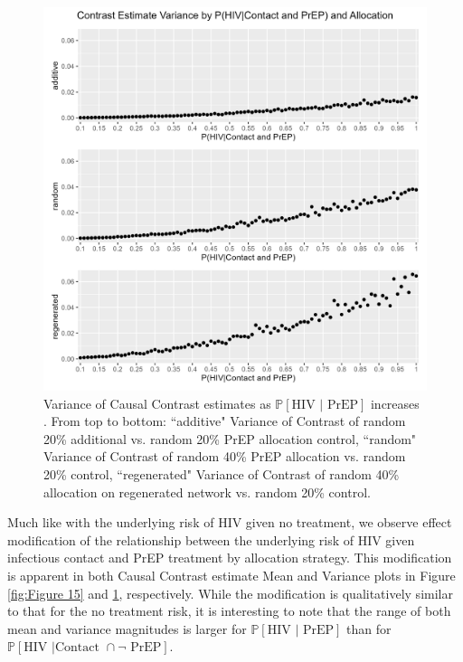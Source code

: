 \documentclass{article}
\theoremstyle{definition}
\begin{document}
\begin{figure}[H]
    \centering
    \includegraphics[width=\linewidth]{Figures/p2 Variance plots.png}
    \caption{Variance of Causal Contrast estimates as $\mathbb{P}\left[\text{HIV } \vert \text{ PrEP}\right]$ increases .  From top to bottom: ``additive" Variance of Contrast of random 20\% additional vs. random 20\% PrEP allocation control, ``random" Variance of Contrast of random 40\% PrEP allocation vs. random 20\% control, ``regenerated" Variance of Contrast of random 40\% allocation on regenerated network vs. random 20\% control.}
    \label{fig:Figure 16}
\end{figure}
Much like with the underlying risk of HIV given no treatment, we observe effect modification of the relationship between the underlying risk of HIV given infectious contact and PrEP treatment by allocation strategy. This modification is apparent in both Causal Contrast estimate Mean and Variance plots in Figure \ref{fig:Figure 15} and \ref{fig:Figure 16}, respectively. While the modification is qualitatively similar to that for the no treatment risk, it is interesting to note that the range of both mean and variance magnitudes is larger for $\mathbb{P}\left[\text{HIV } \vert \text{ PrEP}\right]$ than for $\mathbb{P}\left[\text{HIV } \vert \text {Contact } \cap \neg \text{ PrEP}\right]$.
\end{document}
